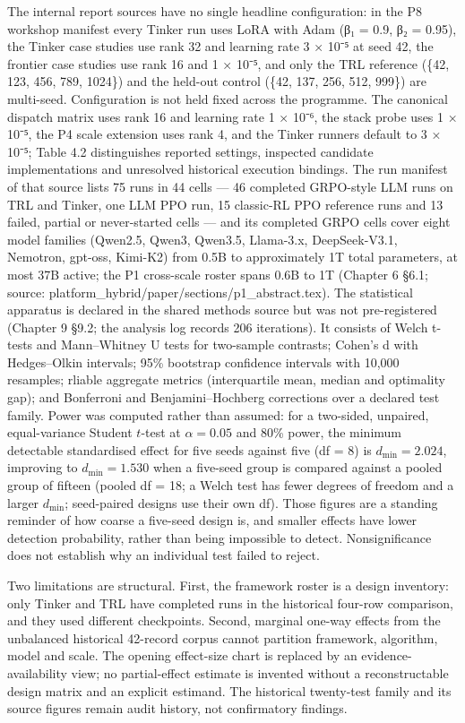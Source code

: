 \documentclass[12pt,a4paper]{report}
\begin{document}
The internal report sources have no single headline configuration: in
the P8 workshop manifest every Tinker run uses LoRA with Adam (β₁ = 0.9,
β₂ = 0.95), the Tinker case studies use rank 32 and learning rate 3 ×
10⁻⁵ at seed 42, the frontier case studies use rank 16 and 1 × 10⁻⁵, and
only the TRL reference (\{42, 123, 456, 789, 1024\}) and the held-out
control (\{42, 137, 256, 512, 999\}) are multi-seed. Configuration is
not held fixed across the programme. The canonical dispatch matrix uses
rank 16 and learning rate 1 × 10⁻⁶, the stack probe uses 1 × 10⁻⁵, the
P4 scale extension uses rank 4, and the Tinker runners default to 3 ×
10⁻⁵; Table 4.2 distinguishes reported settings, inspected candidate
implementations and unresolved historical execution bindings. The run
manifest of that source lists 75 runs in 44 cells --- 46 completed
GRPO-style LLM runs on TRL and Tinker, one LLM PPO run, 15 classic-RL
PPO reference runs and 13 failed, partial or never-started cells --- and
its completed GRPO cells cover eight model families (Qwen2.5, Qwen3,
Qwen3.5, Llama-3.x, DeepSeek-V3.1, Nemotron, gpt-oss, Kimi-K2) from 0.5B
to approximately 1T total parameters, at most 37B active; the P1
cross-scale roster spans 0.6B to 1T (Chapter 6 §6.1; source:
platform\_hybrid/paper/sections/p1\_abstract.tex). The statistical
apparatus is declared in the shared methods source but was not
pre-registered (Chapter 9 §9.2; the analysis log records 206
iterations). It consists of Welch t-tests and Mann--Whitney U tests for
two-sample contrasts; Cohen's d with Hedges--Olkin intervals; 95\%
bootstrap confidence intervals with 10,000 resamples; rliable aggregate
metrics (interquartile mean, median and optimality gap); and Bonferroni
and Benjamini--Hochberg corrections over a declared test family. Power
was computed rather than assumed: for a two-sided, unpaired,
equal-variance Student \(t\)-test at \(\alpha = 0.05\) and 80\% power,
the minimum detectable standardised effect for five seeds against five
(df = 8) is \(d_{\min} = 2.024\), improving to \(d_{\min} = 1.530\) when
a five-seed group is compared against a pooled group of fifteen (pooled
df = 18; a Welch test has fewer degrees of freedom and a larger
\(d_{\min}\); seed-paired designs use their own df). Those figures are a
standing reminder of how coarse a five-seed design is, and smaller
effects have lower detection probability, rather than being impossible
to detect. Nonsignificance does not establish why an individual test
failed to reject.

Two limitations are structural. First, the framework roster is a design
inventory: only Tinker and TRL have completed runs in the historical
four-row comparison, and they used different checkpoints. Second,
marginal one-way effects from the unbalanced historical 42-record corpus
cannot partition framework, algorithm, model and scale. The opening
effect-size chart is replaced by an evidence-availability view; no
partial-effect estimate is invented without a reconstructable design
matrix and an explicit estimand. The historical twenty-test family and
its source figures remain audit history, not confirmatory findings.
\end{document}
